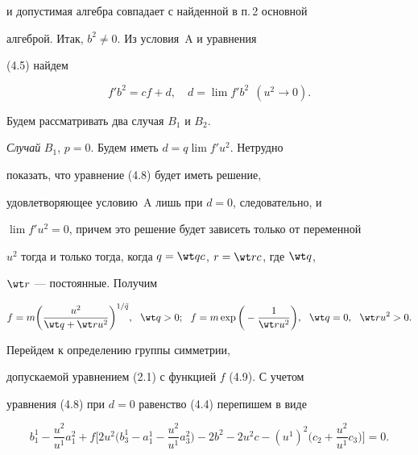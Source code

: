 и допустимая алгебра совпадает с найденной в п.\,2 основной 


алгеброй. Итак, $b^2\ne0$. Из условия~A и уравнения 


(4.5) найдем 


\begin{equation} 


f' b^2=cf+d,\quad d=\lim f' b^2\ \ (u^2\to0). 


\end{equation} 


 


Будем рассматривать два случая $B_1$ и $B_2$. 


 


{\it Случай} $B_1$, $p=0$. Будем иметь $d=q\lim f' u^2$. Нетрудно 


показать, что уравнение (4.8) будет иметь решение, 


удовлетворяющее условию~A лишь при $d=0$, следовательно, и 


$\lim f' u^2=0$, причем это решение будет зависеть только от переменной 


$u^2$ тогда и только тогда, когда $q=\wt qc$, $r=\wt rc$, где $\wt q$, 


$\wt r$ --- постоянные. Получим 


\begin{equation} 


f=m\bigg(\frac{u^2}{\wt q+\wt ru^2} \bigg)^{1/\Tilde q},\ \ 


\wt q>0;\ \ f=m\exp\bigg(-\frac{1}{\wt ru^2} \bigg), 


\ \ \wt q=0,\ \ \wt ru^2>0. 


\end{equation} 


 


Перейдем к определению группы симметрии, 


допускаемой уравнением (2.1) с функцией $f$ (4.9). С учетом 


уравнения (4.8) при $d=0$ равенство (4.4) перепишем в виде 


\begin{equation} 


b^1_1-\frac{u^2}{u^1}a^2_1+f\bigg[2u^2\bigg(b^1_3-a^1_1- 


\frac{u^2}{u^1}a^2_3\bigg)-2b^2-2u^2c-(u^1)^2\bigg( 


c_2+\frac{u^2}{u^1}c_3\bigg)\bigg]=0. 


\end{equation} 


